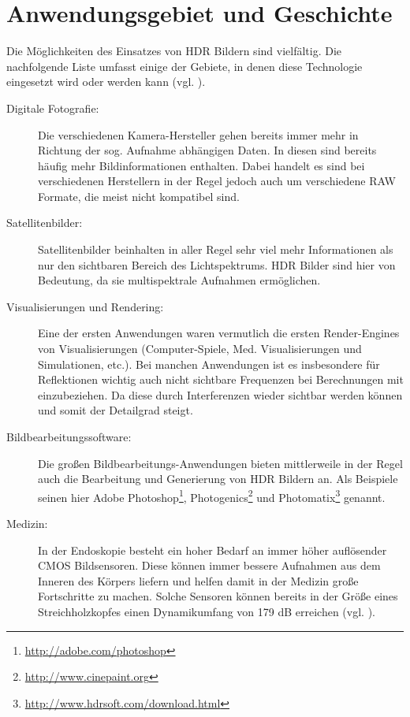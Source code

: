 \section{Anwendungsgebiet und Geschichte}

Die Möglichkeiten des Einsatzes von \gls{HDR} Bildern sind vielfältig. Die nachfolgende Liste umfasst einige der Gebiete, in denen diese Technologie eingesetzt wird oder werden kann (vgl. \cite[S.~87f]{Reinhard}).

\begin{description}

\item[Digitale Fotografie:] Die verschiedenen Kamera-Hersteller gehen bereits immer mehr in Richtung der sog. Aufnahme abhängigen Daten. In diesen sind bereits häufig mehr Bildinformationen enthalten. Dabei handelt es sind bei verschiedenen Herstellern in der Regel jedoch auch um verschiedene \gls{RAW} Formate, die meist nicht kompatibel sind. 

\item[Satellitenbilder:] Satellitenbilder beinhalten in aller Regel sehr viel mehr Informationen als nur den sichtbaren Bereich des Lichtspektrums. \gls{HDR} Bilder sind hier von Bedeutung, da sie multispektrale Aufnahmen ermöglichen.

\item[Visualisierungen und Rendering:] Eine der ersten Anwendungen waren vermutlich die ersten Render-Engines von Visualisierungen (Computer-Spiele, Med. Visualisierungen und Simulationen, etc.). Bei manchen Anwendungen ist es insbesondere für Reflektionen wichtig auch nicht sichtbare Frequenzen bei Berechnungen mit einzubeziehen. Da diese durch Interferenzen wieder sichtbar werden können und somit der Detailgrad steigt.

\item[Bildbearbeitungssoftware:] Die großen Bildbearbeitungs-Anwendungen bieten mittlerweile in der Regel auch die Bearbeitung und Generierung von \gls{HDR} Bildern an. Als Beispiele seinen hier Adobe Photoshop\footnote{\url{http://adobe.com/photoshop}}, Photogenics\footnote{\url{http://www.cinepaint.org}} und Photomatix\footnote{\url{http://www.hdrsoft.com/download.html}} genannt.

\item[Medizin:] In der Endoskopie besteht ein hoher Bedarf an immer höher auflösender \gls{CMOS} Bildsensoren. Diese können immer bessere Aufnahmen aus dem Inneren des Körpers liefern und helfen damit in der Medizin große Fortschritte zu machen. Solche Sensoren können bereits in der Größe eines Streichholzkopfes einen Dynamikumfang von 179 dB erreichen (vgl. \cite{Klingler_Richter_Strobel_2006}).


\end{description}
